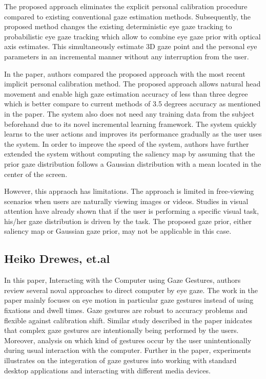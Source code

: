  The proposed approach eliminates the explicit personal calibration procedure compared to existing conventional gaze estimation methods. Subsequently, the proposed method changes the existing deterministic eye gaze tracking to probabilistic eye gaze tracking which allow to combine eye gaze prior with optical axis estimates. This simultaneously estimate 3D gaze point and the personal eye parameters in an incremental manner without any interruption from the user.


In the paper, authors compared the proposed approach with the most recent implicit personal calibration method. The proposed approach allows natural head movement and enable high gaze estimation accuracy of less than three degree which is better compare to current methods of 3.5 degrees accuracy as mentioned in the paper. The system also does not need any training data from the subject beforehand due to its novel incremental learning framework. The system quickly learns to the user actions and improves its performance gradually as the user uses the system. In order to improve the speed of the system, authors have further extended the system without computing the saliency map by assuming that the prior gaze distribution follows a Gaussian distribution with a mean located in the center of the screen.

However, this appraoch has limitations. The approach is limited in free-viewing scenarios when users are naturally viewing images or videos. Studies in visual attention have already shown that if the user is performing a specific visual task, his/her gaze distribution is driven by the task. The proposed gaze prior, either saliency map or Gaussian gaze prior, may not be applicable in this case.

\subsection{Heiko Drewes, et.al \cite{22}}

In this paper, Interacting with the Computer using Gaze Gestures, authors review several noval approaches to direct computer by eye gaze. The work in the paper mainly focuses on eye motion in particular gaze gestures instead of using fixations and dwell times. Gaze gestures are robust to accuracy problems and flexible against calibration shift. Similar study described in the paper inidcates that complex gaze gestures are intentionally being performed by the users. Moreover, analysis on which kind of gestures occur by the user unintentionally during usual interaction with the computer. Further in the paper, experiments illustrates on the integeration of gaze gestures into working with standard desktop applications and interacting with different media devices.

